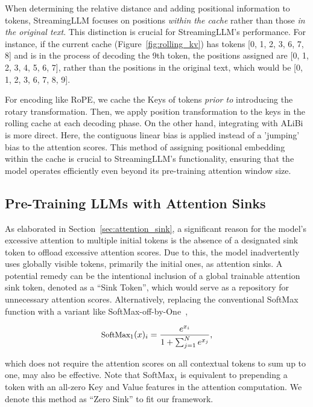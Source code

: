 When determining the relative distance and adding positional information to tokens, StreamingLLM focuses on positions \emph{within the cache} rather than those \emph{in the original text}. This distinction is crucial for StreamingLLM's performance. For instance, if the current cache (Figure~\ref{fig:rolling_kv}) has tokens [0, 1, 2, 3, 6, 7, 8] and is in the process of decoding the 9th token, the positions assigned are [0, 1, 2, 3, 4, 5, 6, 7], rather than the positions in the original text, which would be [0, 1, 2, 3, 6, 7, 8, 9].

For encoding like RoPE, we cache the Keys of tokens \emph{prior to} introducing the rotary transformation. Then, we apply position transformation to the keys in the rolling cache at each decoding phase. On the other hand, integrating with ALiBi is more direct. Here, the contiguous linear bias is applied instead of a 'jumping' bias to the attention scores. This method of assigning positional embedding within the cache is crucial to StreamingLLM's functionality, ensuring that the model operates efficiently even beyond its pre-training attention window size.

\subsection{Pre-Training LLMs with Attention Sinks}
\label{sec:pretrain-fix}

As elaborated in Section~\ref{sec:attention_sink}, a significant reason for the model's excessive attention to multiple initial tokens is the absence of a designated sink token to offload excessive attention scores. Due to this, the model inadvertently uses globally visible tokens, primarily the initial ones, as attention sinks. A potential remedy can be the intentional inclusion of a global trainable attention sink token, denoted as a ``Sink Token'', which would serve as a repository for unnecessary attention scores. Alternatively, replacing the conventional SoftMax function with a variant like SoftMax-off-by-One~\citep{softmax1},

\begin{equation}
    \small
    \text{SoftMax}_1(x)_i = \frac{e^{x_i}}{1+\sum_{j=1}^{N} e^{x_j}},
    \label{equ:softmax1}
\end{equation}

which does not require the attention scores on all contextual tokens to sum up to one, may also be effective. Note that $\text{SoftMax}_1$ is equivalent to prepending a token with an all-zero Key and Value features in the attention computation. We denote this method as ``Zero Sink'' to fit our framework.

